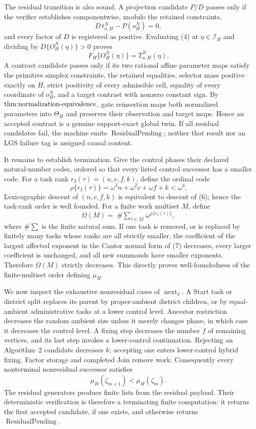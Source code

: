 The residual transition is also sound.  A projection candidate \(P/D\) passes only if the verifier establishes componentwise, modulo the retained constraints,
\[
 D\,t_{a,H}^N-P(o_H^N)=0,
\tag{4}
\]
and every factor of \(D\) is registered as positive.  Evaluating (4) at \(\eta\in\mathcal I_H\) and dividing by \(D\{O_H^N(\eta)\}>0\) proves
\[
 F_H\{O_H^N(\eta)\}=T_{a,H}^N(\eta).
\tag{5}
\]
A contrast candidate passes only if its two rational affine parameter maps satisfy the primitive simplex constraints, the retained equalities, selector mass positive exactly on \(H\), strict positivity of every admissible cell, equality of every coordinate of \(o_H^N\), and a target contrast with nonzero constant sign.  By \(\textnormal{thm:normalization-equivalence}\), gate reinsertion maps both normalized parameters into \(\Theta_H\) and preserves their observation and target maps.  Hence an accepted contrast is a genuine support-exact global twin.  If all residual candidates fail, the machine emits \(\operatorname{ResidualPending}\); neither that result nor an LGS failure tag is assigned causal content.

It remains to establish termination.  Give the control phases their declared natural-number codes, ordered so that every listed control successor has a smaller code.  For a task rank \(r_I(\tau)=(n,c,f,k)\), define the ordinal code
\[
 \rho\{r_I(\tau)\}
 =\omega^3n+\omega^2c+\omega f+k<\omega^4.
\tag{6}
\]
Lexicographic descent of \((n,c,f,k)\) is equivalent to descent of (6); hence the task-rank order is well founded.  For a finite work multiset \(M\), define
\[
 \Omega(M)=\mathop{\#\!\sum}_{\tau\in M}
 \omega^{\rho\{r_I(\tau)\}},
\tag{7}
\]
where \(\#\!\sum\) is the finite natural sum.  If one task is removed, or is replaced by finitely many tasks whose ranks are all strictly smaller, the coefficient of the largest affected exponent in the Cantor normal form of (7) decreases, every larger coefficient is unchanged, and all new summands have smaller exponents.  Therefore \(\Omega(M)\) strictly decreases.  This directly proves well-foundedness of the finite-multiset order defining \(\mu_H\).

We now inspect the exhaustive nonresidual cases of \(\operatorname{next}_I\).  A Start task or district split replaces its parent by proper-ambient district children, or by equal-ambient administrative tasks at a lower control level.  Ancestor restriction decreases the random ambient size unless it merely changes phase, in which case it decreases the control level.  A fixing step decreases the number \(f\) of remaining vertices, and its last step invokes a lower-control continuation.  Rejecting an Algorithm--2 candidate decreases \(k\); accepting one enters lower-control hybrid fixing.  Factor storage and completed Join remove work.  Consequently every nonterminal nonresidual successor satisfies
\[
 \mu_H(\zeta_{m+1})<\mu_H(\zeta_m).
\tag{8}
\]
The residual generators produce finite lists from the residual payload.  Their deterministic verification is therefore a terminating finite computation: it returns the first accepted candidate, if one exists, and otherwise returns \(\operatorname{ResidualPending}\).

